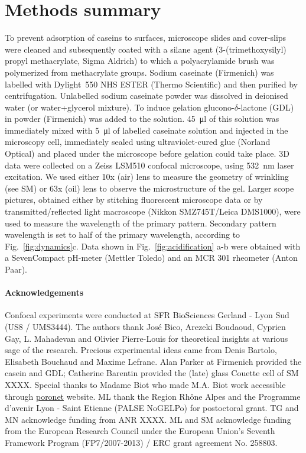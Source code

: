\documentclass[twocolumn,superscriptaddress,showpacs,preprintnumbers,
amsmath,amssymb,prl]{revtex4-1}
\begin{document}
\section*{Methods summary}
To prevent adsorption of caseins to surfaces, microscope slides and cover-slips were cleaned and subsequently coated with a silane agent (3-(trimethoxysilyl) propyl methacrylate, Sigma Aldrich) to which a polyacrylamide brush was polymerized from methacrylate groups.
Sodium caseinate (Firmenich) was labelled with Dylight~550 NHS ESTER (Thermo Scientific) and then purified by centrifugation. Unlabelled sodium caseinate powder was dissolved in deionised water (or water+glycerol mixture). To induce gelation glucono-$\delta$-lactone (GDL) in powder (Firmenich) was added to the solution. \SI{45}{\micro\litre} of this solution was immediately mixed with \SI{5}{\micro\litre} of labelled caseinate solution and injected in the microscopy cell, immediately sealed using ultraviolet-cured glue (Norland Optical) and placed under the microscope before gelation could take place. 
3D data were collected on a Zeiss LSM510 confocal microscope, using \SI{532}{\nano\meter} laser excitation. We used either 10x (air) lens to measure the geometry of wrinkling (see SM) or 63x (oil) lens to observe the microstructure of the gel. Larger scope pictures, obtained either by stitching fluorescent microscope data or by transmitted/reflected light macroscope (Nikkon SMZ745T/Leica DMS1000), were used to measure the wavelength of the primary pattern. Secondary pattern wavelength is set to half of the primary wavelength, according to Fig.~\ref{fig:dynamics}c.
Data shown in Fig.~\ref{fig:acidification} a-b were obtained with a SevenCompact pH-meter (Mettler Toledo) and an MCR 301 rheometer (Anton Paar).




\paragraph*{Acknowledgements}
Confocal experiments were conducted at SFR BioSciences Gerland - Lyon Sud (US8 / UMS3444).
The authors thank José Bico, Arezeki Boudaoud, Cyprien Gay, L. Mahadevan and Olivier Pierre-Louis for theoretical insights at various sage of the research. 
Precious experimental ideas came from Denis Bartolo, Elisabeth Bouchaud and Maxime Lefranc.
Alan Parker at Firmenich provided the casein and GDL; Catherine Barentin provided the (late) glass Couette cell of SM XXXX.
Special thanks to Madame Biot who made M.A. Biot work accessible through \href{http://www.olemiss.edu/sciencenet/poronet/}{poronet} website. 
ML thank the Region Rhône Alpes and the Programme d'avenir Lyon - Saint Etienne (PALSE NoGELPo) for postoctoral grant. 
TG and MN acknowledge funding from ANR XXXX. 
ML and SM acknowledge funding from the European Research Council under the European Union's Seventh Framework Program (FP7/2007-2013) / ERC grant agreement No. 258803.
\end{document}

